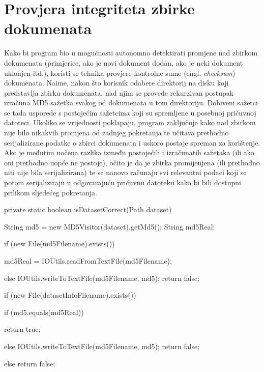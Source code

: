 \documentclass[times, utf8, zavrsni]{fer}
\begin{document}
\section{Provjera integriteta zbirke dokumenata}
Kako bi program bio u mogućnosti autonomno detektirati promjene nad zbirkom dokumenata (primjerice, ako je novi dokument dodan, ako je neki dokument uklonjen itd.), koristi se tehnika provjere kontrolne sume (engl. \textit{checksum}) dokumenata. Naime, nakon što korisnik odabere direktorij na disku koji predstavlja zbirku dokumenata, nad njim se provede rekurzivan postupak izračuna MD5 sažetka svakog od dokumenata u tom direktoriju. Dobiveni sažetci se tada usporede s postojećim sažetcima koji su spremljene u posebnoj pričuvnoj datoteci. Ukoliko se vrijednosti poklapaju, program zaključuje kako nad zbirkom nije bilo nikakvih promjena od zadnjeg pokretanja te učitava prethodno serijalizirane podatke o zbirci dokumenata i uskoro postaje spreman za korištenje. Ako je međutim uočena razlika između postojećih i izračunatih sažetaka (ili ako oni prethodno uopće ne postoje), očito je da je zbirka promijenjena (ili prethodno niti nije bila serijalizirana) te se nanovo računaju svi relevantni podaci koji se potom serijaliziraju u odgovarajuću pričuvnu datoteku kako bi bili dostupni prilikom sljedećeg pokretanja.

\begin{code}[caption={Isječak programskog koda za provjeru ispravnosti zbirke},captionpos=b]
private static boolean isDatasetCorrect(Path dataset) {
    String md5 = new MD5Visitor(dataset).getMd5();
    String md5Real;

    if (new File(md5Filename).exists()) {
        md5Real = IOUtils.readFromTextFile(md5Filename);

    } else {
        IOUtils.writeToTextFile(md5Filename, md5);
        return false;
    }

    if (new File(datasetInfoFilename).exists()) {
        if (md5.equals(md5Real)) {
            return true;

        } else {
            IOUtils.writeToTextFile(md5Filename, md5);
            return false;
        }

    } else {
        return false;
    }
}
\end{code}
\end{document}
